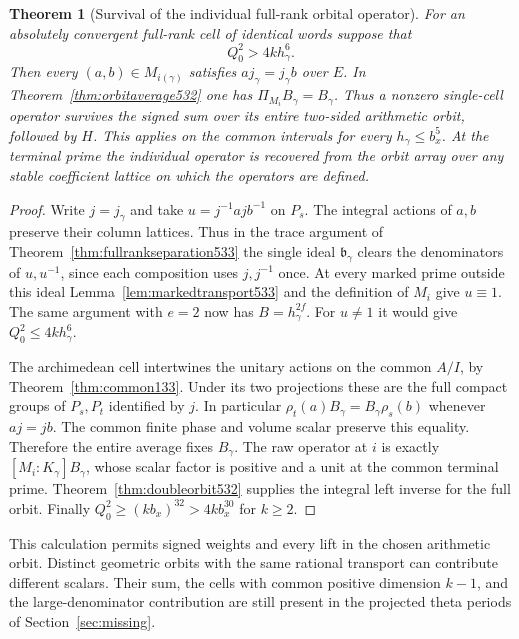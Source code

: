 \documentclass[a4paper,11pt]{article}
\newtheorem{theorem}[proposition]{Theorem}
\theoremstyle{definition}
\theoremstyle{remark}
\numberwithin{equation}{section}
\begin{document}
\begin{theorem}[Survival of the individual full-rank orbital operator]
\leavevmode\label{thm:orbitnoncancellation533}
For an absolutely convergent full-rank cell of identical words
suppose that
\[
                       Q_0^2>4k h_\gamma^6 .
\]
Then every \((a,b)\in M_{i(\gamma)}\) satisfies \(a j_\gamma
=j_\gamma b\) over \(E\). In Theorem~\ref{thm:orbitaverage532}
one has \(\Pi_{M_i}B_\gamma=B_\gamma\).
Thus a nonzero single-cell operator survives the signed sum over
its entire two-sided arithmetic orbit, followed by \(H\).
This applies on the common intervals for every \(h_\gamma\le b_x^5\).
At the terminal prime the individual operator is recovered from
the orbit array over any stable coefficient lattice on which the
operators are defined.
\end{theorem}
\begin{proof}
Write \(j=j_\gamma\) and take \(u=j^{-1}ajb^{-1}\) on \(P_s\).
The integral actions of \(a,b\) preserve their column lattices.
Thus in the trace argument of Theorem~\ref{thm:fullrankseparation533}
the single ideal \(\mathfrak b_\gamma\) clears the denominators
of \(u,u^{-1}\), since each composition uses \(j,j^{-1}\)
once. At every marked prime outside this ideal Lemma~\ref{lem:markedtransport533}
and the definition of \(M_i\) give \(u\equiv1\). The same
argument with \(e=2\) now has \(B=h_\gamma^{2f}\). For
\(u\ne1\) it would give \(Q_0^2\le4k h_\gamma^6\).

The archimedean cell intertwines the unitary actions on the
common \(A/I\), by Theorem~\ref{thm:common133}. Under its two
projections these are the full compact groups of \(P_s,P_t\)
identified by \(j\). In particular
\(\rho_t(a)B_\gamma=B_\gamma\rho_s(b)\) whenever \(aj=jb\).
The common finite phase and volume scalar preserve this equality.
Therefore the entire average fixes \(B_\gamma\). The raw
operator at \(i\) is exactly \([M_i:K_\gamma]B_\gamma\),
whose scalar factor is positive and a unit at the common terminal
prime. Theorem~\ref{thm:doubleorbit532} supplies the integral
left inverse for the full orbit. Finally
\(Q_0^2\ge(kb_x)^{32}>4k b_x^{30}\) for \(k\ge2\).
\end{proof}

This calculation permits signed weights and every lift in the
chosen arithmetic orbit. Distinct geometric orbits with the
same rational transport can contribute different scalars. Their
sum, the cells with common positive dimension \(k-1\), and the
large-denominator contribution are still present in the projected
theta periods of Section~\ref{sec:missing}.
\end{document}
